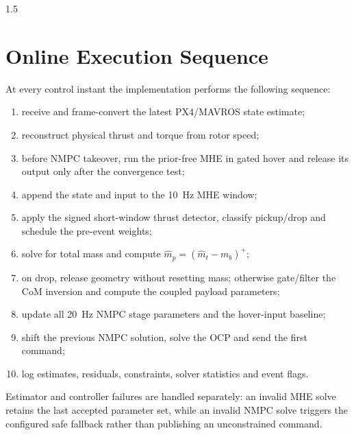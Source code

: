 \begin{spacing}{1.5}
\section{Online Execution Sequence}

At every control instant the implementation performs the following sequence:
\begin{enumerate}
    \item receive and frame-convert the latest PX4/MAVROS state estimate;
    \item reconstruct physical thrust and torque from rotor speed;
    \item before NMPC takeover, run the prior-free MHE in gated hover and release its output only after the convergence test;
    \item append the state and input to the \SI{10}{Hz} MHE window;
    \item apply the signed short-window thrust detector, classify pickup/drop and schedule the pre-event weights;
    \item solve for total mass and compute $\hat m_p=(\hat m_t-m_b)^+$;
    \item on drop, release geometry without resetting mass; otherwise gate/filter the CoM inversion and compute the coupled payload parameters;
    \item update all \SI{20}{Hz} NMPC stage parameters and the hover-input baseline;
    \item shift the previous NMPC solution, solve the OCP and send the first command;
    \item log estimates, residuals, constraints, solver statistics and event flags.
\end{enumerate}
Estimator and controller failures are handled separately: an invalid MHE solve retains the last accepted parameter set, while an invalid NMPC solve triggers the configured safe fallback rather than publishing an unconstrained command.

\end{spacing}
\newpage
